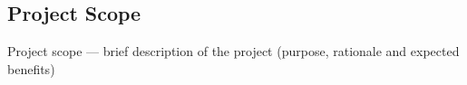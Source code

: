 \subsection{Project Scope}

Project scope — brief description of the project (purpose, rationale and expected benefits)
